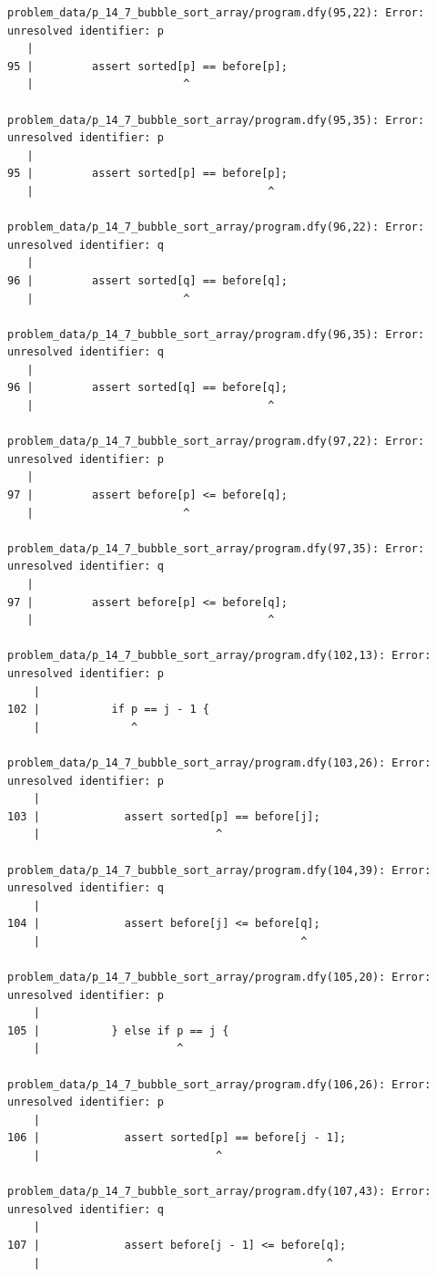 \documentclass{article}
\begin{document}
\begin{lstlisting}
problem_data/p_14_7_bubble_sort_array/program.dfy(95,22): Error: unresolved identifier: p
   |
95 |         assert sorted[p] == before[p];
   |                       ^

problem_data/p_14_7_bubble_sort_array/program.dfy(95,35): Error: unresolved identifier: p
   |
95 |         assert sorted[p] == before[p];
   |                                    ^

problem_data/p_14_7_bubble_sort_array/program.dfy(96,22): Error: unresolved identifier: q
   |
96 |         assert sorted[q] == before[q];
   |                       ^

problem_data/p_14_7_bubble_sort_array/program.dfy(96,35): Error: unresolved identifier: q
   |
96 |         assert sorted[q] == before[q];
   |                                    ^

problem_data/p_14_7_bubble_sort_array/program.dfy(97,22): Error: unresolved identifier: p
   |
97 |         assert before[p] <= before[q];
   |                       ^

problem_data/p_14_7_bubble_sort_array/program.dfy(97,35): Error: unresolved identifier: q
   |
97 |         assert before[p] <= before[q];
   |                                    ^

problem_data/p_14_7_bubble_sort_array/program.dfy(102,13): Error: unresolved identifier: p
    |
102 |           if p == j - 1 {
    |              ^

problem_data/p_14_7_bubble_sort_array/program.dfy(103,26): Error: unresolved identifier: p
    |
103 |             assert sorted[p] == before[j];
    |                           ^

problem_data/p_14_7_bubble_sort_array/program.dfy(104,39): Error: unresolved identifier: q
    |
104 |             assert before[j] <= before[q];
    |                                        ^

problem_data/p_14_7_bubble_sort_array/program.dfy(105,20): Error: unresolved identifier: p
    |
105 |           } else if p == j {
    |                     ^

problem_data/p_14_7_bubble_sort_array/program.dfy(106,26): Error: unresolved identifier: p
    |
106 |             assert sorted[p] == before[j - 1];
    |                           ^

problem_data/p_14_7_bubble_sort_array/program.dfy(107,43): Error: unresolved identifier: q
    |
107 |             assert before[j - 1] <= before[q];
    |                                            ^


\end{lstlisting}
\end{document}
